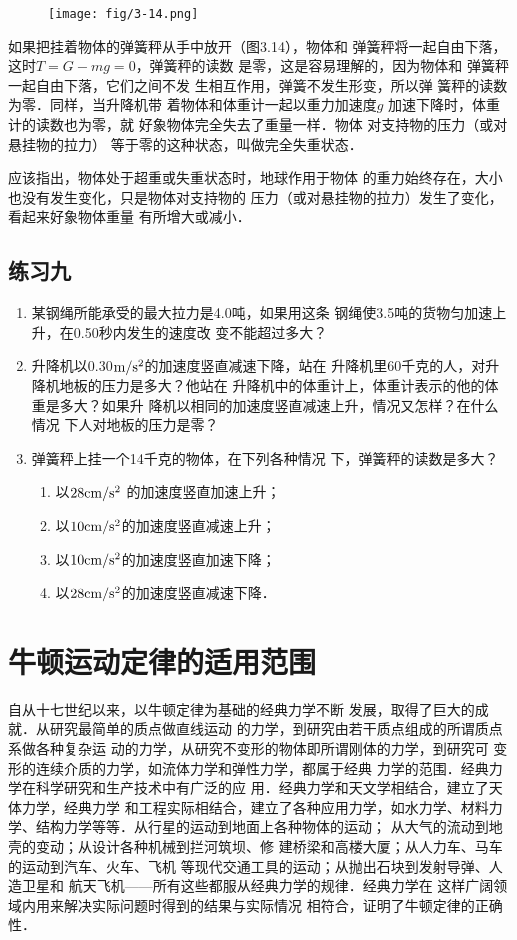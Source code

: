 \begin{figure}[htp]
\centering
\texttt{[image: fig/3-14.png]}
\caption{}
\end{figure}

    如果把挂着物体的弹簧秤从手中放开（图3.14），物体和
弹簧秤将一起自由下落，这时$T=G-mg=0$，弹簧秤的读数
是零，这是容易理解的，因为物体和
弹簧秤一起自由下落，它们之间不发
生相互作用，弹簧不发生形变，所以弹
簧秤的读数为零．同样，当升降机带
着物体和体重计一起以重力加速度$g$
加速下降时，体重计的读数也为零，就
好象物体完全失去了重量一样．物体
对支持物的压力（或对悬挂物的拉力）
等于零的这种状态，叫做完全失重状态．

    应该指出，物体处于超重或失重状态时，地球作用于物体
的重力始终存在，大小也没有发生变化，只是物体对支持物的
压力（或对悬挂物的拉力）发生了变化，看起来好象物体重量
有所增大或减小．


\subsection*{练习九}
\begin{enumerate}
\item 某钢绳所能承受的最大拉力是4.0吨，如果用这条
钢绳使3.5吨的货物匀加速上升，在0.50秒内发生的速度改
变不能超过多大？
\item 升降机以0.30$\text{m}/\text{s}^2$的加速度竖直减速下降，站在
升降机里60千克的人，对升降机地板的压力是多大？他站在
升降机中的体重计上，体重计表示的他的体重是多大？如果升
降机以相同的加速度竖直减速上升，情况又怎样？在什么情况
下人对地板的压力是零？
\item 弹簧秤上挂一个14千克的物体，在下列各种情况
下，弹簧秤的读数是多大？
\begin{enumerate}
\item 以$28{\rm cm}/{\rm s^2}$ 的加速度竖直加速上升；
\item 以$10{\rm cm}/{\rm s^2}$的加速度竖直减速上升；
\item 以$10{\rm cm}/{\rm s^2}$的加速度竖直加速下降；
\item 以$28{\rm cm}/{\rm s^2}$的加速度竖直减速下降．
\end{enumerate}
\end{enumerate}

\section{牛顿运动定律的适用范围}
    自从十七世纪以来，以牛顿定律为基础的经典力学不断
发展，取得了巨大的成就．从研究最简单的质点做直线运动
的力学，到研究由若干质点组成的所谓质点系做各种复杂运
动的力学，从研究不变形的物体即所谓刚体的力学，到研究可
变形的连续介质的力学，如流体力学和弹性力学，都属于经典
力学的范围．经典力学在科学研究和生产技术中有广泛的应
用．经典力学和天文学相结合，建立了天体力学，经典力学
和工程实际相结合，建立了各种应用力学，如水力学、材料力
学、结构力学等等．从行星的运动到地面上各种物体的运动；
从大气的流动到地壳的变动；从设计各种机械到拦河筑坝、修
建桥梁和高楼大厦；从人力车、马车的运动到汽车、火车、飞机
等现代交通工具的运动；从抛出石块到发射导弹、人造卫星和
航天飞机——所有这些都服从经典力学的规律．经典力学在
这样广阔领域内用来解决实际问题时得到的结果与实际情况
相符合，证明了牛顿定律的正确性．


